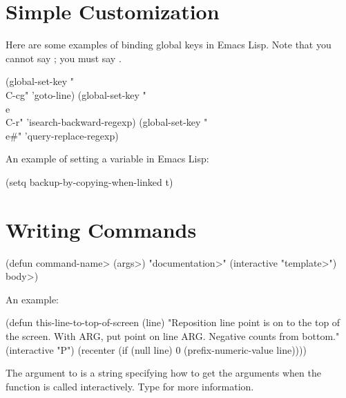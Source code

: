 \section{Simple Customization}


Here are some examples of binding global keys in Emacs Lisp.  Note
that you cannot say ; you must say .

\beginexample%
(global-set-key "\\C-cg" 'goto-line)
(global-set-key "\\e\\C-r" 'isearch-backward-regexp)
(global-set-key "\\e\#" 'query-replace-regexp)
\endexample

An example of setting a variable in Emacs Lisp:

\beginexample%
(setq backup-by-copying-when-linked t)
\endexample

\section{Writing Commands}

\beginexample%
(defun \<command-name> (\<args>)
  "\<documentation>"
  (interactive "\<template>")
  \<body>)
\endexample

An example:

\beginexample%
(defun this-line-to-top-of-screen (line)
  "Reposition line point is on to the top of
the screen.  With ARG, put point on line ARG.
Negative counts from bottom."
  (interactive "P")
  (recenter (if (null line)
                0
              (prefix-numeric-value line))))
\endexample

The argument to  is a string specifying how to get
the arguments when the function is called interactively.
Type  for more information.

\copyrightnotice

\bye

